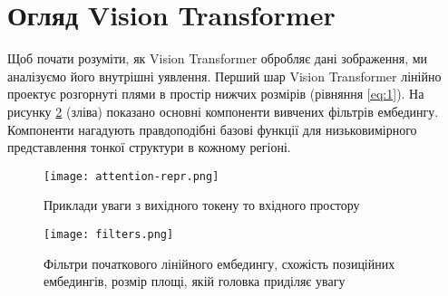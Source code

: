 \section{Огляд Vision Transformer}
Щоб почати розуміти, як Vision Transformer обробляє дані
зображення, ми аналізуємо його внутрішні уявлення. Перший шар
Vision Transformer лінійно проектує розгорнуті плями в простір
нижчих розмірів (рівняння \ref{eq:1}).
На рисунку \ref{fig:filters} (зліва) показано основні
компоненти вивчених фільтрів ембедингу.
Компоненти нагадують правдоподібні базові функції
для низьковимірного представлення тонкої структури в кожному
регіоні.

\begin{figure}[H]
    \centering
    \texttt{[image: attention-repr.png]}
    \caption{Приклади уваги з вихідного токену то вхідного простору}
    \label{fig:attention-repr}
\end{figure}

\begin{figure}[H]
    \centering
    \texttt{[image: filters.png]}
    \caption{Фільтри початкового лінійного ембедингу, схожість позиційних ембедингів, розмір площі, якій головка приділяє увагу}
    \label{fig:filters}
\end{figure}